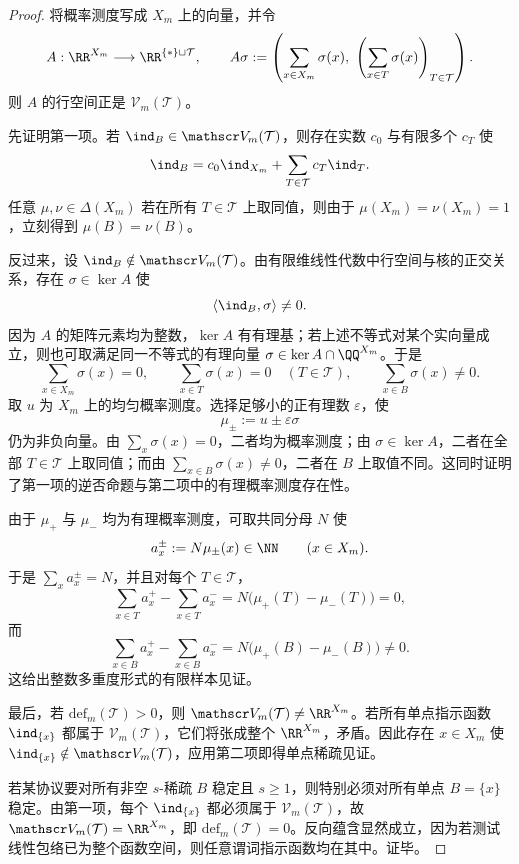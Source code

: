 \begin{proof}
将概率测度写成 \(X_m\) 上的向量，并令
\[
A:\RR^{X_m}\longrightarrow \RR^{\{\ast\}\sqcup\mathcal T},
\qquad
A\sigma:=\left(\sum_{x\in X_m}\sigma(x),\ \left(\sum_{x\in T}\sigma(x)\right)_{T\in\mathcal T}\right).
\]
则 \(A\) 的行空间正是 \(\mathscr V_m(\mathcal T)\)。

先证明第一项。若 \(\ind_B\in\mathscr V_m(\mathcal T)\)，则存在实数 \(c_0\) 与有限多个 \(c_T\) 使
\[
\ind_B=c_0\ind_{X_m}+\sum_{T\in\mathcal T}c_T\ind_T.
\]
任意 \(\mu,\nu\in\Delta(X_m)\) 若在所有 \(T\in\mathcal T\) 上取同值，则由于 \(\mu(X_m)=\nu(X_m)=1\)，立刻得到 \(\mu(B)=\nu(B)\)。

反过来，设 \(\ind_B\notin\mathscr V_m(\mathcal T)\)。由有限维线性代数中行空间与核的正交关系，存在 \(\sigma\in\ker A\) 使
\[
\langle \ind_B,\sigma\rangle\ne0.
\]
因为 \(A\) 的矩阵元素均为整数，\(\ker A\) 有有理基；若上述不等式对某个实向量成立，则也可取满足同一不等式的有理向量 \(\sigma\in\ker A\cap\QQ^{X_m}\)。于是
\[
\sum_{x\in X_m}\sigma(x)=0,
\qquad
\sum_{x\in T}\sigma(x)=0\quad(T\in\mathcal T),
\qquad
\sum_{x\in B}\sigma(x)\ne0.
\]
取 \(u\) 为 \(X_m\) 上的均匀概率测度。选择足够小的正有理数 \(\varepsilon\)，使
\[
\mu_\pm:=u\pm\varepsilon\sigma
\]
仍为非负向量。由 \(\sum_x\sigma(x)=0\)，二者均为概率测度；由 \(\sigma\in\ker A\)，二者在全部 \(T\in\mathcal T\) 上取同值；而由 \(\sum_{x\in B}\sigma(x)\ne0\)，二者在 \(B\) 上取值不同。这同时证明了第一项的逆否命题与第二项中的有理概率测度存在性。

由于 \(\mu_+\) 与 \(\mu_-\) 均为有理概率测度，可取共同分母 \(N\) 使
\[
a_x^\pm:=N\mu_\pm(x)\in\NN\qquad(x\in X_m).
\]
于是 \(\sum_xa_x^\pm=N\)，并且对每个 \(T\in\mathcal T\)，
\[
\sum_{x\in T}a_x^+-\sum_{x\in T}a_x^-
=N\bigl(\mu_+(T)-\mu_-(T)\bigr)=0,
\]
而
\[
\sum_{x\in B}a_x^+-\sum_{x\in B}a_x^-
=N\bigl(\mu_+(B)-\mu_-(B)\bigr)\ne0.
\]
这给出整数多重度形式的有限样本见证。

最后，若 \(\mathrm{def}_m(\mathcal T)>0\)，则 \(\mathscr V_m(\mathcal T)\ne\RR^{X_m}\)。若所有单点指示函数 \(\ind_{\{x\}}\) 都属于 \(\mathscr V_m(\mathcal T)\)，它们将张成整个 \(\RR^{X_m}\)，矛盾。因此存在 \(x\in X_m\) 使 \(\ind_{\{x\}}\notin\mathscr V_m(\mathcal T)\)，应用第二项即得单点稀疏见证。

若某协议要对所有非空 \(s\)-稀疏 \(B\) 稳定且 \(s\ge1\)，则特别必须对所有单点 \(B=\{x\}\) 稳定。由第一项，每个 \(\ind_{\{x\}}\) 都必须属于 \(\mathscr V_m(\mathcal T)\)，故 \(\mathscr V_m(\mathcal T)=\RR^{X_m}\)，即 \(\mathrm{def}_m(\mathcal T)=0\)。反向蕴含显然成立，因为若测试线性包络已为整个函数空间，则任意谓词指示函数均在其中。证毕。
\end{proof}

